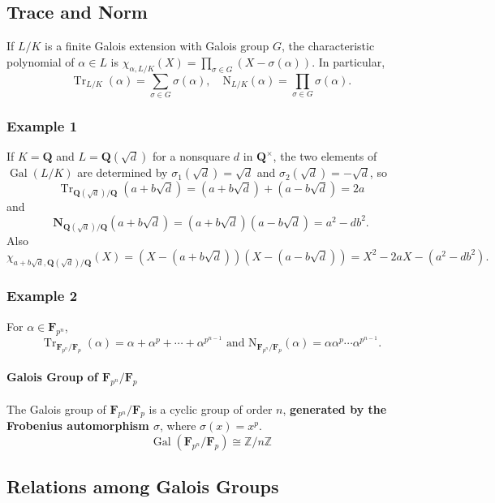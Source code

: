 \subsection{Trace and Norm}

\begin{definition}
If $L / K$ is a finite Galois extension with Galois group $G$, the characteristic polynomial of $\alpha \in L$ is $\chi_{\alpha, L / K}(X)=\prod_{\sigma \in G}(X-\sigma(\alpha))$. In particular,
\[
\operatorname{Tr}_{L / K}(\alpha)=\sum_{\sigma \in G} \sigma(\alpha), \quad \mathrm{N}_{L / K}(\alpha)=\prod_{\sigma \in G} \sigma(\alpha) .
\]
\end{definition}
\subsubsection{Example 1}

If $K=\mathbf{Q}$ and $L=\mathbf{Q}(\sqrt{d})$ for a nonsquare $d$ in $\mathbf{Q}^{\times}$, the two elements of $\operatorname{Gal}(L / K)$ are determined by $\sigma_1(\sqrt{d})=\sqrt{d}$ and $\sigma_2(\sqrt{d})=-\sqrt{d}$, so
\[
\operatorname{Tr}_{\mathbf{Q}(\sqrt{d}) / \mathbf{Q}}(a+b \sqrt{d})=(a+b \sqrt{d})+(a-b \sqrt{d})=2 a
\]
and
\[
\mathbf{N}_{\mathbf{Q}(\sqrt{d}) / \mathbf{Q}}(a+b \sqrt{d})=(a+b \sqrt{d})(a-b \sqrt{d})=a^2-d b^2 .
\]
Also
\[
\chi_{a+b \sqrt{d}, \mathbf{Q}(\sqrt{d}) / \mathbf{Q}}(X)=(X-(a+b \sqrt{d}))(X-(a-b \sqrt{d}))=X^2-2 a X-\left(a^2-d b^2\right) .
\]
\subsubsection{Example 2}

For $\alpha \in \mathbf{F}_{p^n}$,
\[
\operatorname{Tr}_{\mathbf{F}_{p^n} / \mathbf{F}_p}(\alpha)=\alpha+\alpha^p+\cdots+\alpha^{p^{n-1}} \text { and } \mathrm{N}_{\mathbf{F}_{p^n} / \mathbf{F}_p}(\alpha)=\alpha \alpha^p \cdots \alpha^{p^{n-1}} .
\]
\paragraph{Galois Group of \texorpdfstring{$\mathbf{F}_{p^n} / \mathbf{F}_p$}{mathbfF_p^n / mathbfF_p}}

The Galois group of $\mathbf{F}_{p^n} / \mathbf{F}_p$ is a cyclic group of order $n$, \textbf{generated by the Frobenius automorphism $\sigma$}, where $\sigma(x) = x^p$.
\[
\operatorname{Gal}(\mathbf{F}_{p^n} / \mathbf{F}_p) \cong \mathbb{Z} / n \mathbb{Z}
\]
\subsection{Relations among Galois Groups}

